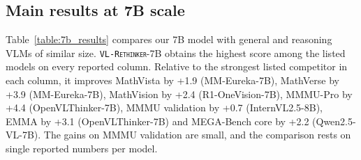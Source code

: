 \documentclass{article}
\newcommand{\model}{\texttt{\textsc{VL-Rethinker}}\xspace}
\begin{document}
\subsection{Main results at 7B scale}

Table~\ref{table:7b_results} compares our 7B model with general and reasoning VLMs of similar size. \model-7B obtains the highest score among the listed models on every reported column. Relative to the strongest listed competitor in each column, it improves MathVista by +1.9 (MM-Eureka-7B), MathVerse by +3.9 (MM-Eureka-7B), MathVision by +2.4 (R1-OneVision-7B), MMMU-Pro by +4.4 (OpenVLThinker-7B), MMMU validation by +0.7 (InternVL2.5-8B), EMMA by +3.1 (OpenVLThinker-7B) and MEGA-Bench core by +2.2 (Qwen2.5-VL-7B). The gains on MMMU validation are small, and the comparison rests on single reported numbers per model.
\end{document}
